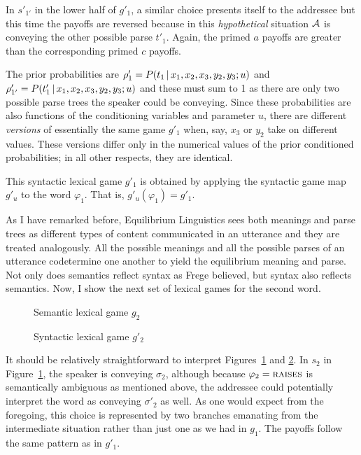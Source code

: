 In $s'_{1'}$ in the lower half of $g'_1$, a similar choice presents itself to the addressee but this time the payoffs are reversed because in this \emph{hypothetical} situation $\cal A$ is conveying the other possible parse $t'_1$. Again, the primed $a$ payoffs are greater than the corresponding primed $c$ payoffs.

The prior probabilities are $\rho'_1 = P(t_1 \,|\, x_1, x_2, x_3, y_2, y_3; u)$ and $\rho'_{1'} = P(t'_1 \,|\, x_1,\allowbreak x_2,\allowbreak x_3, y_2, y_3; u)$ and these must sum to 1 as there are only two possible parse trees the speaker could be conveying. Since these probabilities are also functions of the conditioning variables and parameter $u$, there are different \emph{versions} of essentially the same game $g'_1$ when, say, $x_3$ or $y_2$ take on different values. These versions differ only in the numerical values of the prior conditioned probabilities; in all other respects, they are identical.

This syntactic lexical game $g'_1$ is obtained by applying the syntactic game map $g'_u$ to the word $\varphi_1$. That is, $g'_u(\varphi_1) = g'_1$.

As I have remarked before, Equilibrium Linguistics sees both meanings and parse trees as different types of content communicated in an utterance and they are treated analogously. All the possible meanings and all the possible parses of an utterance codetermine one another to yield the equilibrium meaning and parse. Not only does semantics reflect syntax as Frege believed, but syntax also reflects semantics. Now, I show the next set of lexical games for the second word.

\begin{figure}[h] 

\caption{Semantic lexical game $g_2$}
\label{fig:semantic lexical game g2 - new example}
\end{figure}


\begin{figure}[h] 

\caption{Syntactic lexical game $g'_2$}
\label{fig:syntactic lexical game g2' - new example}
\end{figure}

It should be relatively straightforward to interpret Figures~\ref{fig:semantic lexical game g2 - new example} and \ref{fig:syntactic lexical game g2' - new example}. In $s_2$ in Figure~\ref{fig:semantic lexical game g2 - new example}, the speaker is conveying $\sigma_2$, although because $\varphi_2 = \Expression{raises}$ is semantically ambiguous as mentioned above, the addressee could potentially interpret the word as conveying $\sigma'_2$ as well. As one would expect from the foregoing, this choice is represented by two branches emanating from the intermediate situation rather than just one as we had in $g_1$. The payoffs follow the same pattern as in $g'_1$.

